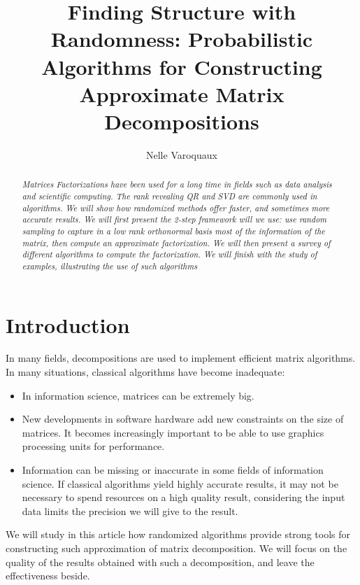 \documentclass[onecolumn,12pt]{article}
\author{Nelle Varoquaux}
\title{Finding Structure with Randomness: Probabilistic Algorithms for
Constructing Approximate Matrix Decompositions}
\begin{document}
\maketitle
\begin{abstract}
\it{Matrices Factorizations have been used for a long time in fields such as
data analysis and scientific computing. The rank revealing QR and SVD are
commonly used in algorithms. We will show how \textit{randomized} methods
offer faster, and sometimes more accurate results. We will first present the
2-step \textit{framework} will we use: use random sampling to capture in a low
rank orthonormal basis most of the information of the matrix, then compute an
approximate factorization. We will then present a survey of different
algorithms to compute the factorization. We will finish with the study of
examples, illustrating the use of such algorithms}
\end{abstract}

\tableofcontents

\section{Introduction}

In many fields, decompositions are used to implement efficient matrix
algorithms. In many situations, classical algorithms have become inadequate:

\begin{itemize}
\item In information science, matrices can be extremely big.
\item New developments in software hardware add new constraints on the size of
matrices. It becomes increasingly important to be able to use graphics
processing units for performance.
\item Information can be missing or inaccurate in some fields of information
science. If classical algorithms yield highly accurate results, it may not be
necessary to spend resources on a high quality result, considering the input
data limits the precision we will give to the result.
\end{itemize}

We will study in this article how randomized algorithms provide strong tools
for constructing such approximation of matrix decomposition. We will focus on
the quality of the results obtained with such a decomposition, and leave the
effectiveness beside.

\end{document}
